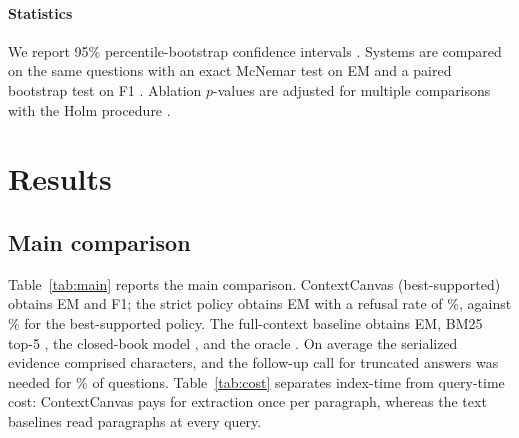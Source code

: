 \documentclass[preprint,12pt,authoryear]{elsarticle}
\begin{document}
\paragraph{Statistics}
We report 95\% percentile-bootstrap confidence intervals \citep{efron1993bootstrap}.
Systems are compared on the same questions with an exact McNemar test on EM \citep{mcnemar1947} and a paired bootstrap test on F1 \citep{dror2018hitchhiker}.
Ablation $p$-values are adjusted for multiple comparisons with the Holm procedure \citep{holm1979}.

\section{Results}
\label{sec:results}

\subsection{Main comparison}

\begin{table}[t]
\centering\small
\caption{Held-out MuSiQue results. All systems use the same language model, answer format and evidence budget.}
\label{tab:main}
\resizebox{\ifdim\width>\linewidth\linewidth\else\width\fi}{!}{}

\end{table}

\begin{table}[t]
\centering\small
\caption{Cost per question.}
\label{tab:cost}


\end{table}

Table~\ref{tab:main} reports the main comparison.
ContextCanvas (best-supported) obtains \ResCCEM{} EM and \ResCCFOne{} F1; the strict policy obtains \ResCCStrictEM{} EM with a refusal rate of \ResCCStrictRefusal\%, against \ResCCRefusal\% for the best-supported policy.
The full-context baseline obtains \ResFullEM{} EM, BM25 top-5 \ResBMfiveEM{}, the closed-book model \ResClosedEM{}, and the oracle \ResOracleEM{}.
On average the serialized evidence comprised \ResCCEvidenceChars{} characters, and the follow-up call for truncated answers was needed for \ResCCFinalizeRate\% of questions.
Table~\ref{tab:cost} separates index-time from query-time cost: ContextCanvas pays for extraction once per paragraph, whereas the text baselines read paragraphs at every query.
\end{document}
